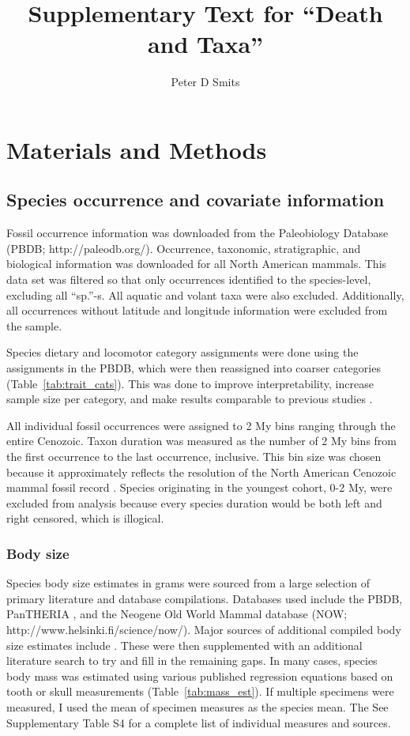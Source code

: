 \documentclass{article}
\title{Supplementary Text for ``Death and Taxa''}
\author{Peter D Smits}
\begin{document}
\maketitle
\linenumbers
\modulolinenumbers[2]

\section{Materials and Methods}

\subsection{Species occurrence and covariate information}
Fossil occurrence information was downloaded from the Paleobiology Database (PBDB; http://paleodb.org/). Occurrence, taxonomic, stratigraphic, and biological information was downloaded for all North American mammals. This data set was filtered so that only occurrences identified to the species-level, excluding all ``sp.''-s. All aquatic and volant taxa were also excluded. Additionally, all occurrences without latitude and longitude information were excluded from the sample.

Species dietary and locomotor category assignments were done using the assignments in the PBDB, which were then reassigned into coarser categories (Table~\ref{tab:trait_cats}). This was done to improve interpretability, increase sample size per category, and make results comparable to previous studies \cite{Jernvall2004,Price2012}.

All individual fossil occurrences were assigned to 2 My bins ranging through the entire Cenozoic. Taxon duration was measured as the number of 2 My bins from the first occurrence to the last occurrence, inclusive. This bin size was chosen because it approximately reflects the resolution of the North American Cenozoic mammal fossil record \cite{Alroy2009,Alroy2000g,Marcot2014}. Species originating in the youngest cohort, 0-2 My, were excluded from analysis because every species duration would be both left and right censored, which is illogical.

\subsubsection{Body size}
Species body size estimates in grams were sourced from a large selection of primary literature and database compilations. Databases used include the PBDB, PanTHERIA \cite{Jones2009c}, and the Neogene Old World Mammal database (NOW; http://www.helsinki.fi/science/now/). Major sources of additional compiled body size estimates include \cite{Brook2004a,Freudenthal2013,McKenna2011,Raia2012f,Smith2004c,Tomiya2013}. These were then supplemented with an additional literature search to try and fill in the remaining gaps. In many cases, species body mass was estimated using various published regression equations based on tooth or skull measurements (Table~\ref{tab:mass_est}). If multiple specimens were measured, I used the mean of specimen measures as the species mean. The See Supplementary Table S4 for a complete list of individual measures and sources.
\end{document}
